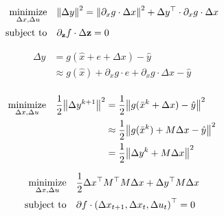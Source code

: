 \documentclass{article}
\newcommand{\minimize}[1]{\underset{#1}{\text{minimize}}}
\newcommand{\st}{\text{subject to}}
\begin{document}
\begin{align*}
\underset{\Delta x, \Delta u}{\text{minimize}} &\quad \norm{\Delta y}^2 = \norm{\partial_x g \cdot \Delta x}^2 + \Delta y^\top \cdot \partial_x g \cdot \Delta x \\
\text{subject to} &\quad \partial_{\vb{z}}f \cdot \Delta {\vb{z}} = 0 \\
\end{align*}

\begin{align*}
  \Delta y &= g(\hat x + e + \Delta x) - \hat y \\
  &\approx g(\hat x) + \partial_x g \cdot e + \partial_x g \cdot \Delta x - \hat y \\
\end{align*}

\begin{align*}
  \minimize{\Delta x, \Delta u} \quad \frac{1}{2} \norm{\Delta y^{k+1}}^2 &= 
    \frac{1}{2} \norm{g(\bar x^k + \Delta x) - \hat y}^2 \\ 
    &\approx \frac{1}{2} \norm{g(\bar x^k) + M \Delta x - \hat y}^2 \\
    &= \frac{1}{2} \norm{\Delta y^k + M \Delta x}^2 \\
\end{align*}

\begin{align*}
  \minimize{\Delta x, \Delta u} &\quad \frac{1}{2} \Delta x^\top M^\top M \Delta x + \Delta y^\top M \Delta x\\
  \st &\quad \partial f \cdot \qty(\Delta x_{t+1}, \Delta x_t, \Delta u_t)^\top = 0 \\
\end{align*}
 
 
\end{document}
